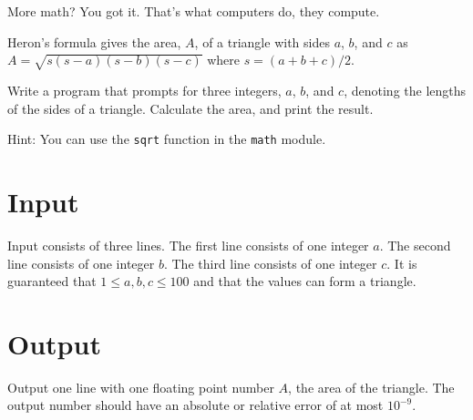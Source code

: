 
More math? You got it. That's what computers do, they compute.

Heron's formula gives the area, $A$, of a triangle with sides $a$, $b$, and $c$ as $A = \sqrt{s(s-a)(s-b)(s-c)}$
where $s = (a+b+c)/2$.

Write a program that prompts for three integers, $a$, $b$, and $c$, denoting the lengths of the sides of a triangle.
Calculate the area, and print the result.

Hint: You can use the \texttt{sqrt} function in the \texttt{math} module.

\section*{Input}
Input consists of three lines.
The first line consists of one integer $a$.
The second line consists of one integer $b$.
The third line consists of one integer $c$.
It is guaranteed that $1 \leq a, b, c \leq 100$ and that the values can form a triangle.

\section*{Output}
Output one line with one floating point number $A$, the area of the triangle.
The output number should have an absolute or relative error of at most $10^{-9}$.
